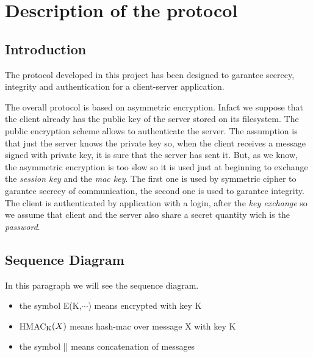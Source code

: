 \chapter{Description of the protocol}
\section{Introduction}
   
   The protocol developed in this project has been designed to garantee secrecy, integrity and authentication for a client-server application. 

   The overall protocol is based on asymmetric encryption. Infact we suppose that the client already has the public key of the server stored on
   its filesystem. The public encryption scheme allows to authenticate the server. The assumption is that just the server knows the private key so, when the client receives a message signed with private key, it is sure that the server has sent it. But, as we know, the asymmetric encryption is too slow so it is used just at beginning to exchange the \textit{session key} and the \textit{mac key}. The first one is used by symmetric cipher to garantee secrecy of communication, the second one is used to garantee integrity. The client is authenticated by application with a login, after the \textit{key exchange} so we assume that client and the server also share a secret quantity wich is the \textit{password}.
\section{Sequence Diagram}
In this paragraph we will see the sequence diagram. 
\begin{itemize}
	\item the symbol E(K,$\cdots$) means encrypted with key K
	\item HMAC$\textsubscript{K}(X)$ means hash-mac over message X with key K
	\item the symbol || means concatenation of messages
\end{itemize}

